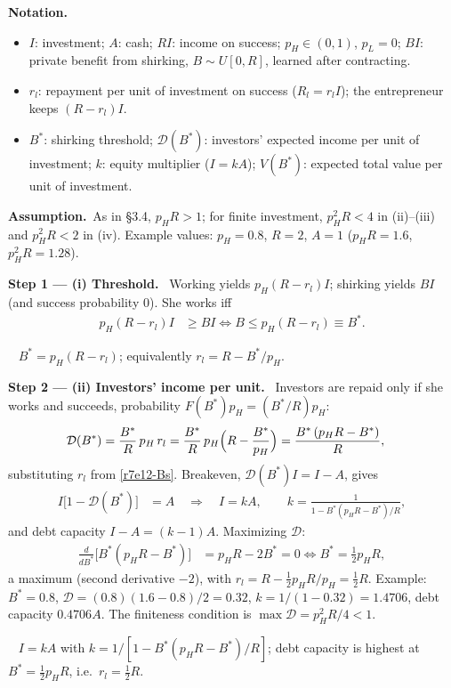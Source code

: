 \documentclass[11pt,a4paper]{article}
\newcommand{\notation}{\par\noindent\textbf{Notation.}}
\newcommand{\step}[2]{\par\medskip\noindent\textbf{Step #1 --- #2.}~}
\newcommand{\assume}{\par\smallskip\noindent\textbf{Assumption.}~}
\newcommand{\answer}[1]{\par\smallskip\noindent\fbox{\textbf{Answer #1.}}~}
\begin{document}
\notation
\begin{itemize}
  \item $I$: investment; $A$: cash; $RI$: income on success; $p_H\in(0,1)$, $p_L=0$; $BI$: private benefit from shirking, $B\sim U[0,R]$, learned after contracting.
  \item $r_l$: repayment per unit of investment on success ($R_l=r_lI$); the entrepreneur keeps $(R-r_l)I$.
  \item $B^*$: shirking threshold; $\mathcal D(B^*)$: investors' expected income per unit of investment; $k$: equity multiplier ($I=kA$); $V(B^*)$: expected total value per unit of investment.
\end{itemize}

\assume As in \S3.4, $p_HR>1$; for finite investment, $p_H^2R<4$ in (ii)--(iii) and $p_H^2R<2$ in (iv). Example values: $p_H=0.8$, $R=2$, $A=1$ ($p_HR=1.6$, $p_H^2R=1.28$).

\step{1}{(i) Threshold} Working yields $p_H(R-r_l)I$; shirking yields $BI$ (and success probability 0). She works iff
\begin{align}
  p_H(R-r_l)I &\ge BI \iff B \le p_H(R-r_l) \equiv B^*. \label{r7e12-Bs}
\end{align}
\answer{(i)} $B^*=p_H(R-r_l)$; equivalently $r_l=R-B^*/p_H$.

\step{2}{(ii) Investors' income per unit} Investors are repaid only if she works and succeeds, probability $F(B^*)p_H=(B^*/R)p_H$:
\begin{align}
  \mathcal D(B^*) &= \frac{B^*}{R}\,p_H\,r_l = \frac{B^*}{R}\,p_H\Bigl(R-\frac{B^*}{p_H}\Bigr) = \frac{B^*\,(p_HR-B^*)}{R}, \label{r7e12-D}
\end{align}
substituting $r_l$ from \eqref{r7e12-Bs}. Breakeven, $\mathcal D(B^*)I=I-A$, gives
\begin{align}
  I\bigl[1-\mathcal D(B^*)\bigr] &= A \quad\Longrightarrow\quad I = kA, \qquad k = \frac{1}{1-B^*(p_HR-B^*)/R}, \label{r7e12-k}
\end{align}
and debt capacity $I-A=(k-1)A$. Maximizing $\mathcal D$:
\begin{align}
  \frac{d}{dB^*}\bigl[B^*(p_HR-B^*)\bigr] &= p_HR-2B^* = 0 \iff B^* = \tfrac12p_HR, \nonumber
\end{align}
a maximum (second derivative $-2$), with $r_l=R-\tfrac12p_HR/p_H=\tfrac12R$. Example: $B^*=0.8$, $\mathcal D=(0.8)(1.6-0.8)/2=0.32$, $k=1/(1-0.32)=1.4706$, debt capacity $0.4706A$. The finiteness condition is $\max\mathcal D=p_H^2R/4<1$.
\answer{(ii)} $I=kA$ with $k=1/[1-B^*(p_HR-B^*)/R]$; debt capacity is highest at $B^*=\tfrac12p_HR$, i.e.\ $r_l=\tfrac12R$.
\end{document}
